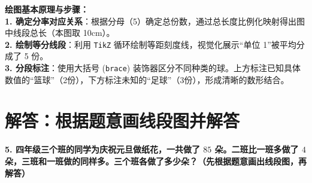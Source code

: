 {\small\color{blue!70!black}
\textbf{绘图基本原理与步骤：}\\
\textbf{1. 确定分率对应关系}：根据分母（5）确定总份数，通过总长度比例化映射得出图中线段总长（本图取 10cm）。\\
\textbf{2. 绘制等分线段}：利用 \texttt{TikZ} 循环绘制等距刻度线，视觉化展示“单位 1”被平均分成了 5 份。\\
\textbf{3. 分段标注}：使用大括号 (\texttt{brace}) 装饰器区分不同种类的球。上方标注已知具体数值的“篮球”（2份），下方标注未知的“足球”（3份），形成清晰的数形结合。
}

\newpage




\newpage

\section{解答：根据题意画线段图并解答}

\vspace{0.4cm}

\noindent\textbf{5. 四年级三个班的同学为庆祝元旦做纸花，一共做了 $85$ 朵。二班比一班多做了 $4$ 朵，三班和一班做的同样多。三个班各做了多少朵？（先根据题意画出线段图，再解答）}

\vspace{0.8cm}

